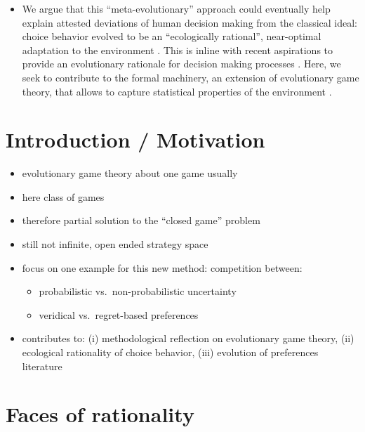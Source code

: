\documentclass[fleqn,reqno,11pt]{article}
\begin{document}
\begin{itemize}
\item We argue that this ``meta-evolutionary'' approach could eventually help explain attested
  deviations of human decision making from the classical ideal: choice behavior evolved to be
  an ``ecologically rational'', near-optimal adaptation to the environment
  \citep{Anderson1990:The-Adaptive-Ch,Anderson1991:Is-human-cognit,GigerenzerGoldstein1996:Reasoning-the-F,ChaterOaksford2000:The-Rational-An}. This
  is inline with recent aspirations to provide an evolutionary rationale for decision making
  processes
  \citep[e.g.][]{HammersteinStevens2012:Six-Reasons-for,FawcettHamblin2013:Exposing-the-be}. Here,
  we seek to contribute to the formal machinery, an extension of evolutionary game theory, that
  allows to capture statistical properties of the environment
  \citep[cf.][]{McNamara2013:Towards-a-Riche}.

\end{itemize}


\newpage 

\section{Introduction / Motivation}

\begin{itemize}
\item evolutionary game theory about one game usually
\item here class of games
\item therefore partial solution to the ``closed game'' problem
\item still not infinite, open ended strategy space
\item focus on one example for this new method: competition between:
  \begin{itemize}
  \item probabilistic vs.~non-probabilistic uncertainty
  \item veridical vs.~regret-based preferences
  \end{itemize}
\item contributes to: (i) methodological reflection on evolutionary game theory, (ii) ecological
  rationality of choice behavior, (iii) evolution of preferences literature
\end{itemize}

\section{Faces of rationality}
\end{document}
